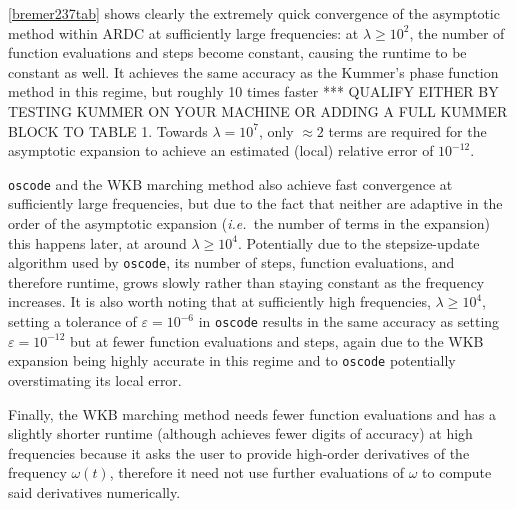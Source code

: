 \documentclass[10pt]{article}
\newcommand{\ie}{{\it i.e.\ }}
\newcommand{\om}{\omega}
\begin{document}
\begin{table}[tb]
    \renewcommand{\arraystretch}{1.2}
    \resizebox{\textwidth}{!}{}
    \caption{\label{bremer237tab} Accuracy, runtime and evaluation statistics of the algorithms
      considered (the present method,
      \texttt{oscode},
      and the WKB marching method) when applied to \cref{bremer237eq}.
      See Section~\ref{solvercomp} for an expanation of column headers
      and solver settings.}
\end{table}

\cref{bremer237tab} shows clearly the extremely quick convergence of the asymptotic method within ARDC
at sufficiently large frequencies: at $\lambda \geq 10^2$, the number of
function evaluations and steps become constant, causing the runtime to be
constant as well. It achieves the same accuracy as the Kummer's phase function method in
this regime, but roughly 10 times faster
*** QUALIFY EITHER BY TESTING KUMMER ON YOUR MACHINE OR ADDING A
FULL KUMMER BLOCK TO TABLE 1.  %
Towards $\lambda = 10^7$, only
$\approx 2$ terms are required for the asymptotic expansion to achieve an
estimated (local) relative error of $10^{-12}$. 

\texttt{oscode} and the WKB
marching method also achieve fast convergence at sufficiently large
frequencies, but due to the fact that neither are adaptive in the order of the
asymptotic expansion (\ie the number of terms in the expansion) this
happens later, at around $\lambda \geq 10^4$. Potentially due to the
stepsize-update algorithm used by \texttt{oscode}, its number of steps,
function evaluations, and therefore runtime, grows slowly rather than staying
constant as the frequency increases. It is also worth noting that at
sufficiently high frequencies, $\lambda \geq 10^4$, setting a tolerance of
$\varepsilon = 10^{-6}$ in \texttt{oscode} results in the same accuracy as
setting $\varepsilon = 10^{-12}$ but at fewer function evaluations and steps,
again due to the WKB expansion being highly accurate in this regime and to
\texttt{oscode} potentially overstimating its local error.

Finally, the WKB marching method needs fewer function evaluations and has a
slightly shorter runtime (although achieves fewer digits of accuracy) at high
frequencies because it asks the user to provide high-order derivatives of the
frequency $\om(t)$, therefore it need not use further evaluations of $\om$ to
compute said derivatives numerically.
\end{document}
